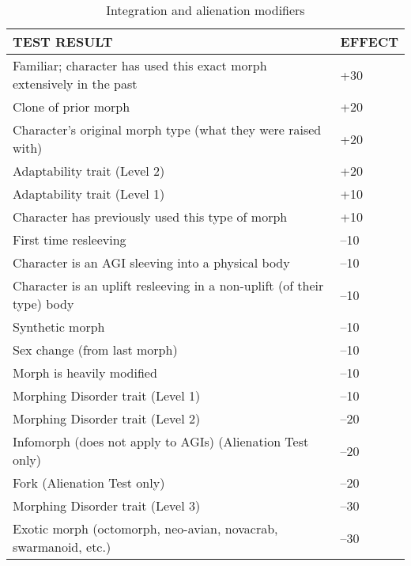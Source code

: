 \begin{table} \caption{Integration and alienation modifiers} \begin{tabular}{|l|l|} 



\hline

TEST RESULT &EFFECT \\ \hline

Familiar; character has used this exact morph extensively in the past &+30 \\ \hline

Clone of prior morph &+20 \\ \hline

Character’s original morph type (what they were raised with) &+20 \\ \hline

Adaptability trait (Level 2) &+20 \\ \hline

Adaptability trait (Level 1) &+10 \\ \hline

Character has previously used this type of morph &+10 \\ \hline

First time resleeving &–10 \\ \hline

Character is an AGI sleeving into a physical body &–10 \\ \hline

Character is an uplift resleeving in a non-uplift (of their type) body &–10 \\ \hline

Synthetic morph &–10 \\ \hline

Sex change (from last morph) &–10 \\ \hline

Morph is heavily modified &–10 \\ \hline

Morphing Disorder trait (Level 1) &–10 \\ \hline

Morphing Disorder trait (Level 2) &–20 \\ \hline

Infomorph (does not apply to AGIs) (Alienation Test only) &–20 \\ \hline

Fork (Alienation Test only) &–20 \\ \hline

Morphing Disorder trait (Level 3) &–30 \\ \hline

Exotic morph (octomorph, neo-avian, novacrab, swarmanoid, etc.) &–30 \\ \hline

\end{tabular} \end{table} 

